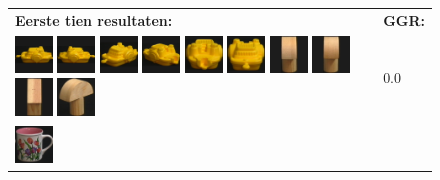 \begin{figure}[!bp]
\vspace{5pt}
\centering
\begin{tabular}{m{11cm} | m{3cm} |}
\textbf{Eerste tien resultaten:} & \textbf{GGR:} \\
\vspace{4pt}
\includegraphics[width=1cm]{coil/beeld-12.eps}
\includegraphics[width=1cm]{coil/beeld-13.eps}
\includegraphics[width=1cm]{coil/beeld-15.eps}
\includegraphics[width=1cm]{coil/beeld-16.eps}
\includegraphics[width=1cm]{coil/beeld-17.eps}
\includegraphics[width=1cm]{coil/beeld-14.eps}
\includegraphics[width=1cm]{coil/beeld-2.eps}
\includegraphics[width=1cm]{coil/beeld-5.eps}
\includegraphics[width=1cm]{coil/beeld-47.eps}
\includegraphics[width=1cm]{coil/beeld-3.eps}
& {\scriptsize 0.0}
\\
\includegraphics[width=1cm]{coil/beeld-6.eps}

\end{tabular}
\end{figure}
